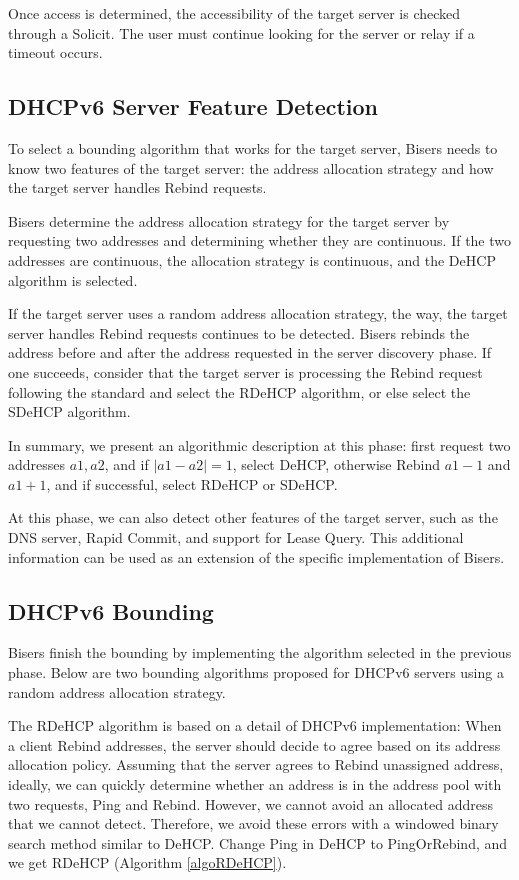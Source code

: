 \documentclass[conference]{IEEEtran}
\begin{document}
Once access is determined, the accessibility of the target server is
checked through a Solicit. The user must continue looking for the
server or relay if a timeout occurs.

\subsection{DHCPv6 Server Feature Detection}

To select a bounding algorithm that works for the target server,
Bisers needs to know two features of the target server: the address
allocation strategy and how the target server handles Rebind requests.

Bisers determine the address allocation strategy for the target server
by requesting two addresses and determining whether they are
continuous. If the two addresses are continuous, the allocation
strategy is continuous, and the DeHCP algorithm is selected.

If the target server uses a random address allocation strategy, the
way, the target server handles Rebind requests continues to be
detected. Bisers rebinds the address before and after the address
requested in the server discovery phase. If one succeeds, consider
that the target server is processing the Rebind request following the
standard and select the RDeHCP algorithm, or else select the SDeHCP
algorithm.

In summary, we present an algorithmic description at this phase: first
request two addresses $a1, a2$, and if $|a1-a2| = 1$, select DeHCP,
otherwise Rebind $a1-1$ and $a1+1$, and if successful, select RDeHCP
or SDeHCP.

At this phase, we can also detect other features of the target server,
such as the DNS server, Rapid Commit, and support for Lease
Query. This additional information can be used as an extension of the
specific implementation of Bisers.

\subsection{DHCPv6 Bounding}

Bisers finish the bounding by implementing the algorithm selected in
the previous phase. Below are two bounding algorithms proposed for
DHCPv6 servers using a random address allocation strategy.

The RDeHCP algorithm is based on a detail of DHCPv6 implementation:
When a client Rebind addresses, the server should decide to agree
based on its address allocation policy. Assuming that the server
agrees to Rebind unassigned address, ideally, we can quickly determine
whether an address is in the address pool with two requests, Ping and
Rebind. However, we cannot avoid an allocated address that we cannot
detect. Therefore, we avoid these errors with a windowed binary search
method similar to DeHCP. Change Ping in DeHCP to PingOrRebind, and we
get RDeHCP (Algorithm \ref{algoRDeHCP}).
\end{document}

